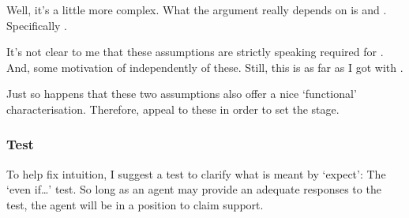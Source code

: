 \begin{note}
  Well, it's a little more complex.
  What the argument really depends on is \ESU{} and \nI{}.
  Specifically \nI{}.

  It's not clear to me that these assumptions are strictly speaking required for \nI{}.
  And, some motivation of \nI{} independently of these.
  Still, this is as far as I got with \nI{}.

  Just so happens that these two assumptions also offer a nice `functional' characterisation.
  Therefore, appeal to these in order to set the stage.
\end{note}

\hozline{}

\subsubsection{Test}

\begin{note}
  To help fix intuition, I suggest a test to clarify what is meant by `expect': The `even if\dots' test.
  So long as an agent may provide an adequate responses to the test, the agent will be in a position to claim support.
\end{note}

